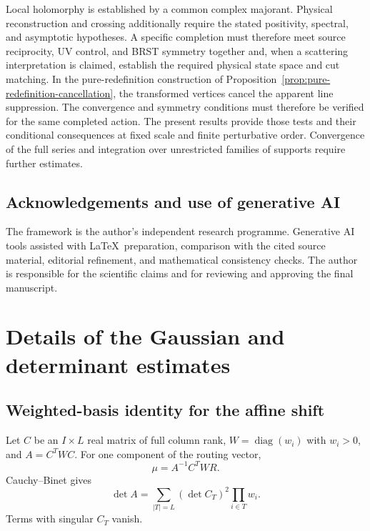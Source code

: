 \documentclass[final,5p,times,twocolumn,numbers,nopreprintline]{elsarticle}
\numberwithin{equation}{section}
\theoremstyle{definition}
\theoremstyle{remark}
\newcommand{\diag}{\operatorname{diag}}
\begin{document}
Local holomorphy is established by a common complex majorant.
Physical reconstruction and crossing additionally require the stated
positivity, spectral, and asymptotic hypotheses. A specific completion
must therefore meet source reciprocity, UV control, and BRST symmetry
together and, when a scattering interpretation is claimed, establish
the required physical state space and cut matching. In the
pure-redefinition construction of
Proposition~\ref{prop:pure-redefinition-cancellation}, the transformed
vertices cancel the apparent line suppression. The convergence and
symmetry conditions must therefore be verified for the same completed
action. The present results provide those tests and their conditional
consequences at fixed scale and finite perturbative order. Convergence
of the full series and integration over unrestricted families of
supports require further estimates.

\begin{samepage}
\section*{Acknowledgements and use of generative AI}

The framework is the author's independent research programme.
Generative AI tools assisted with \LaTeX\ preparation, comparison with
the cited source material, editorial refinement, and mathematical
consistency checks. The author is responsible for the scientific
claims and for reviewing and approving the final manuscript.
\end{samepage}
\appendix
\renewcommand{\thetheorem}{\Alph{section}.\arabic{theorem}}

\section{Details of the Gaussian and determinant estimates}
\label{sec:appendix-gaussian}

\subsection{Weighted-basis identity for the affine shift}

Let \(C\) be an \(I\times L\) real matrix of full column rank,
\(W=\diag(w_i)\) with \(w_i>0\), and
\(A=C^TWC\). For one component of the routing vector,
\[
 \mu=A^{-1}C^TWR.
\]
Cauchy--Binet gives
\begin{equation}
 \det A=\sum_{|T|=L}(\det C_T)^2\prod_{i\in T}w_i.
 \label{eq:CB-appendix}
\end{equation}
Terms with singular \(C_T\) vanish.
\end{document}
